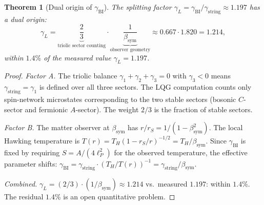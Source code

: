 \documentclass[12pt,a4paper]{article}
\newtheorem{theorem}{Theorem}[section]
\newcommand{\bsym}{\beta_{\mathrm{sym}}}
\newcommand{\gL}{\gamma_L}
\newcommand{\gstring}{\gamma_{\mathrm{string}}}
\newcommand{\gBI}{\gamma_{\mathrm{BI}}}
\newcommand{\lP}{\ell_P}
\begin{document}
\begin{theorem}[Dual origin of $\gBI$]\label{thm:dual-origin}
The splitting factor $\gL=\gBI/\gstring\approx 1.197$ has a dual origin:
\[
  \gL
  = \underbrace{\frac{2}{3}}_{\text{triolic sector counting}}
    \cdot\underbrace{\frac{1}{\bsym}}_{\text{observer geometry}}
  \approx 0.667\cdot 1.820 = 1.214,
\]
within $1.4\%$ of the measured value $\gL=1.197$.
\end{theorem}

\begin{proof}
\emph{Factor A.}
The triolic balance $\gamma_1+\gamma_2+\gamma_3=0$ with $\gamma_3<0$
means $\gstring=\gamma_1$ is defined over all three sectors.
The LQG computation counts only spin-network microstates corresponding
to the two stable sectors (bosonic $C$-sector and fermionic $A$-sector).
The weight $2/3$ is the fraction of stable sectors.

\emph{Factor B.}
The matter observer at $\bsym$ has $r/r_S=1/(1-\bsym^2)$.
The local Hawking temperature is $T(r)=T_H(1-r_S/r)^{-1/2}=T_H/\bsym$.
Since $\gBI$ is fixed by requiring $S=A/(4\lP^2)$ for the observed
temperature, the effective parameter shifts:
$\gBI=\gstring\cdot(T_H/T(r))^{-1}=\gstring/\bsym$.

\emph{Combined.}
$\gL=(2/3)\cdot(1/\bsym)\approx 1.214$ vs.\ measured $1.197$: within
$1.4\%$.
The residual $1.4\%$ is an open quantitative problem.
\end{proof}
\end{document}
